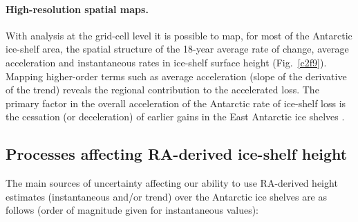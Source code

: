 \paragraph{High-resolution spatial maps.} With analysis at the grid-cell level it is possible to map, for most of the Antarctic ice-shelf area, the spatial structure of the 18-year average rate of change, average acceleration and instantaneous rates in ice-shelf surface height (Fig.~\ref{c2f9}). Mapping higher-order terms such as average acceleration (slope of the derivative of the trend) reveals the regional contribution to the accelerated loss. The primary factor in the overall acceleration of the Antarctic rate of ice-shelf loss is the cessation (or deceleration) of earlier gains in the East Antarctic ice shelves \parencite{Paolo2015}.


\subsection{Processes affecting RA-derived ice-shelf height}

\noindent
The main sources of uncertainty affecting our ability to use RA-derived height estimates (instantaneous and/or trend) over the Antarctic ice shelves are as follows (order of magnitude given for instantaneous values):

